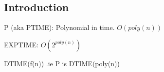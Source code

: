 
\subsection{Introduction}

P (aka PTIME): Polynomial in time. \(O(poly(n))\)

EXPTIME: \(O(2^{poly(n)})\)

DTIME(f(n)) .ie P is DTIME(poly(n))


